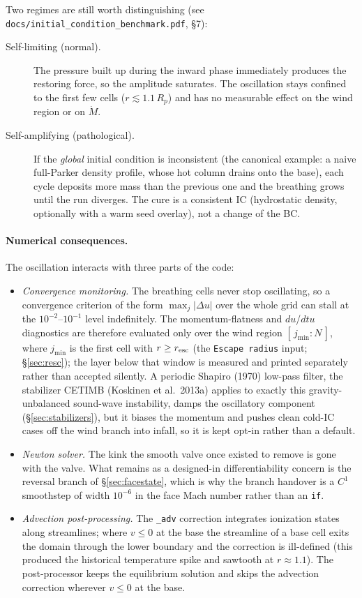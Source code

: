 \documentclass[english,a4paper]{my_memo}
\begin{document}
Two regimes are still worth distinguishing (see
\texttt{docs/initial\_condition\_benchmark.pdf}, \S7):

\begin{description}
\item[Self-limiting (normal).] The pressure built up during the inward
  phase immediately produces the restoring force, so the amplitude
  saturates. The oscillation stays confined to the first few cells
  ($r \lesssim 1.1\,R_p$) and has no measurable effect on the wind region
  or on $\dot M$.
\item[Self-amplifying (pathological).] If the \emph{global} initial
  condition is inconsistent (the canonical example: a naive full-Parker
  density profile, whose hot column drains onto the base), each cycle
  deposits more mass than the previous one and the breathing grows
  until the run diverges. The cure is a consistent IC (hydrostatic
  density, optionally with a warm seed overlay), not a change of the
  BC.
\end{description}

\paragraph{Numerical consequences.}
The oscillation interacts with three parts of the code:
\begin{itemize}
\item \emph{Convergence monitoring.} The breathing cells never stop
  oscillating, so a convergence criterion of the form
  $\max_j|\Delta u|$ over the whole grid can stall at the
  $10^{-2}$--$10^{-1}$ level indefinitely. The momentum-flatness and
  $du$/$dtu$ diagnostics are therefore evaluated only over the wind
  region $[\,j_{\min} : N\,]$, where $j_{\min}$ is the first cell with
  $r \ge r_{\rm esc}$ (the \texttt{Escape radius} input;
  \S\ref{sec:resc}); the layer below that window is measured and printed
  separately rather than accepted silently. A periodic Shapiro (1970)
  low-pass filter, the stabilizer CETIMB (Koskinen et al.\ 2013a) applies
  to exactly this gravity-unbalanced sound-wave instability, damps the
  oscillatory component (\S\ref{sec:stabilizers}), but it biases the
  momentum and pushes clean cold-IC cases off the wind branch into
  infall, so it is kept opt-in rather than a default.
\item \emph{Newton solver.} The kink the smooth valve once existed to
  remove is gone with the valve. What remains as a designed-in
  differentiability concern is the reversal branch of
  \S\ref{sec:facestate}, which is why the branch handover is a $C^1$
  smoothstep of width $10^{-6}$ in the face Mach number rather than an
  \texttt{if}.
\item \emph{Advection post-processing.} The \texttt{\_adv} correction
  integrates ionization states along streamlines; where $v \le 0$ at the
  base the streamline of a base cell exits the domain through the lower
  boundary and the correction is ill-defined (this produced the
  historical temperature spike and sawtooth at $r \approx 1.1$). The
  post-processor keeps the equilibrium solution and skips the advection
  correction wherever $v \le 0$ at the base.
\end{itemize}
\end{document}
